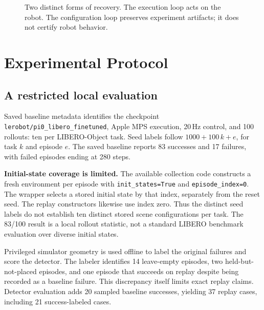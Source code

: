 \documentclass[10pt,twocolumn]{article}
\begin{document}
\begin{figure}[t]
\centering
{}
\caption{Two distinct forms of recovery. The execution loop acts on the robot. The configuration loop preserves experiment artifacts; it does not certify robot behavior.}
\label{fig:loops}
\end{figure}

\section{Experimental Protocol}
\subsection{A restricted local evaluation}
Saved baseline metadata identifies the checkpoint \texttt{lerobot/pi0\_libero\_finetuned}, Apple MPS execution, 20\,Hz control, and 100 rollouts: ten per LIBERO-Object task. Seed labels follow $1000+100\,k+e$, for task $k$ and episode $e$. The saved baseline reports 83 successes and 17 failures, with failed episodes ending at 280 steps.

\textbf{Initial-state coverage is limited.} The available collection code constructs a fresh environment per episode with \texttt{init\_states=True} and \texttt{episode\_index=0}. The wrapper selects a stored initial state by that index, separately from the reset seed. The replay constructors likewise use index zero. Thus the distinct seed labels do not establish ten distinct stored scene configurations per task. The 83/100 result is a local rollout statistic, not a standard LIBERO benchmark evaluation over diverse initial states.

Privileged simulator geometry is used offline to label the original failures and score the detector. The labeler identifies 14 leave-empty episodes, two held-but-not-placed episodes, and one episode that succeeds on replay despite being recorded as a baseline failure. This discrepancy itself limits exact replay claims. Detector evaluation adds 20 sampled baseline successes, yielding 37 replay cases, including 21 success-labeled cases.
\end{document}
